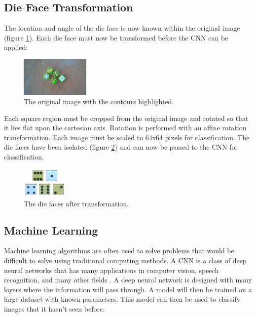 \documentclass[conference]{IEEEtran}
\begin{document}
\subsection{Die Face Transformation}

The location and angle of the die face is now known within the original image (figure \ref{fig:canny}).
Each die face must now be transformed before the CNN can be applied:
\begin{figure}
	\centering
	\includegraphics[width=0.3\textwidth]{canny}
	\caption{The original image with the contours highlighted.}
	\label{fig:canny}
\end{figure}

Each square region must be cropped from the original image and rotated so that it lies flat upon the cartesian axis.
Rotation is performed with an affine rotation transformation.
Each image must be scaled to 64x64 pixels for classification.
The die faces have been isolated (figure \ref{fig:faces}) and can now be passed to the CNN for classification.
\begin{figure}
	\centering
	\includegraphics[width=0.2\textwidth]{faces}
	\caption{The die faces after transformation.}
	\label{fig:faces}
\end{figure}

\subsection{Machine Learning}

Machine learning algorithms are often used to solve problems that would be difficult to solve using traditional computing methods.
A CNN is a class of deep neural networks that has many applications in computer vision, speech recognition, and many other fields \cite{Pena2014}\cite{Madabhushi2016}\cite{Lawrence1997}\cite{Kalchbrenner2014}.
A deep neural network is designed with many layers where the information will pass through.
A model will then be trained on a large dataset with known parameters.
This model can then be used to classify images that it hasn't seen before.
\end{document}
